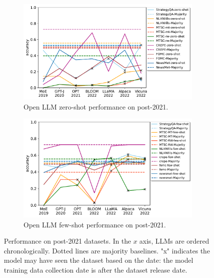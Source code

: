 \documentclass[letterpaper]{article} %
\begin{document}
\begin{figure}[b]
\begin{subfigure}[b]{0.45\textwidth}
            \includegraphics[scale=0.38]{img/output-zero-shot-new-dataset-recent-llm.pdf}
            \caption[]%
            {Open LLM zero-shot performance on post-2021.}    
            \label{fig:Zero shot performance for new datasets}
        \end{subfigure}
        \hfill
        \begin{subfigure}[b]{0.45\textwidth}   
            \centering 
            \includegraphics[scale=0.38]{img/output-few-shot-new-dataset-recent-llm.pdf}
            \caption[]%
            {Open LLM few-shot performance on post-2021.}    
            \label{fig:Few shot performance for new datasets}
        \end{subfigure}
        \caption[]
        {Performance on post-2021 datasets. In the $x$ axis, LLMs are ordered chronologically. Dotted lines are majority baselines. "x" indicates the model may have seen the dataset based on the date: the model training data collection date is after the dataset release date.} 
        \label{fig:experiments-few-shot}
    \end{figure}
\end{document}
